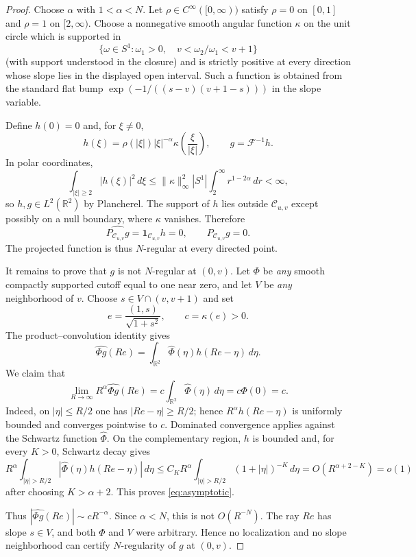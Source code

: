 \documentclass[11pt]{article}
\newcommand{\R}{\mathbb R}
\newcommand{\C}{\mathcal C}
\newcommand{\F}{\mathcal F}
\begin{document}
\begin{proof}
Choose $\alpha$ with $1<\alpha<N$. Let
$\rho\in C^\infty([0,\infty))$ satisfy $\rho=0$ on $[0,1]$ and
$\rho=1$ on $[2,\infty)$. Choose a nonnegative smooth angular function
$\kappa$ on the unit circle which is supported in
\[
 \{\omega\in S^1:\omega_1>0,\quad
               v<\omega_2/\omega_1<v+1\}
\]
(with support understood in the closure) and is strictly positive at every
direction whose slope lies in the displayed open interval. Such a function
is obtained from the standard flat bump
$\exp(-1/((s-v)(v+1-s)))$ in the slope variable.

Define $h(0)=0$ and, for $\xi\ne0$,
\begin{equation}\label{eq:h}
 h(\xi)=\rho(|\xi|)|\xi|^{-\alpha}
        \kappa\!\left(\frac{\xi}{|\xi|}\right),
 \qquad g=\F^{-1}h.
\end{equation}
In polar coordinates,
\[
 \int_{|\xi|\ge2}|h(\xi)|^2\,d\xi
 \le \|\kappa\|_\infty^2 |S^1|
      \int_2^\infty r^{1-2\alpha}\,dr<\infty,
\]
so $h,g\in L^2(\R^2)$ by Plancherel. The support of $h$ lies outside
$\C_{u,v}$ except possibly on a null boundary, where $\kappa$ vanishes.
Therefore
\[
 \widehat{P_{\C_{u,v}}g}=\mathbf1_{\C_{u,v}}h=0,
 \qquad P_{\C_{u,v}}g=0.
\]
The projected function is thus $N$-regular at every directed point.

It remains to prove that $g$ is not $N$-regular at $(0,v)$. Let $\Phi$ be
\emph{any} smooth compactly supported cutoff equal to one near zero, and let
$V$ be \emph{any} neighborhood of $v$. Choose
$s\in V\cap(v,v+1)$ and set
\[
 e=\frac{(1,s)}{\sqrt{1+s^2}},\qquad c=\kappa(e)>0.
\]
The product--convolution identity gives
\begin{equation}\label{eq:conv}
 \widehat{\Phi g}(Re)=\int_{\R^2}\widehat\Phi(\eta)
                                  h(Re-\eta)\,d\eta.
\end{equation}
We claim that
\begin{equation}\label{eq:asymptotic}
 \lim_{R\to\infty}R^\alpha\widehat{\Phi g}(Re)
   =c\int_{\R^2}\widehat\Phi(\eta)\,d\eta
   =c\Phi(0)=c.
\end{equation}
Indeed, on $|\eta|\le R/2$ one has $|Re-\eta|\ge R/2$; hence
$R^\alpha h(Re-\eta)$ is uniformly bounded and converges pointwise to $c$.
Dominated convergence applies against the Schwartz function
$\widehat\Phi$. On the complementary region, $h$ is bounded and, for every
$K>0$, Schwartz decay gives
\[
 R^\alpha\!\int_{|\eta|>R/2}
 |\widehat\Phi(\eta)h(Re-\eta)|\,d\eta
 \le C_K R^\alpha\!\int_{|\eta|>R/2}(1+|\eta|)^{-K}\,d\eta
 =O(R^{\alpha+2-K})=o(1)
\]
after choosing $K>\alpha+2$. This proves \eqref{eq:asymptotic}.

Thus $|\widehat{\Phi g}(Re)|\sim cR^{-\alpha}$. Since $\alpha<N$, this is
not $O(R^{-N})$. The ray $Re$ has slope $s\in V$, and both $\Phi$ and $V$
were arbitrary. Hence no localization and no slope neighborhood can certify
$N$-regularity of $g$ at $(0,v)$.
\end{proof}
\end{document}
